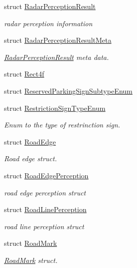 \begin{DoxyCompactItemize}
struct \hyperlink{structmaf__perception__interface_1_1RadarPerceptionResult}{Radar\+Perception\+Result}
\begin{DoxyCompactList}\small\item\em radar perception information \end{DoxyCompactList}\item 
struct \hyperlink{structmaf__perception__interface_1_1RadarPerceptionResultMeta}{Radar\+Perception\+Result\+Meta}
\begin{DoxyCompactList}\small\item\em \hyperlink{structmaf__perception__interface_1_1RadarPerceptionResult}{Radar\+Perception\+Result} meta data. \end{DoxyCompactList}\item 
struct \hyperlink{structmaf__perception__interface_1_1Rect4f}{Rect4f}
\item 
struct \hyperlink{structmaf__perception__interface_1_1ReservedParkingSignSubtypeEnum}{Reserved\+Parking\+Sign\+Subtype\+Enum}
\item 
struct \hyperlink{structmaf__perception__interface_1_1RestrictionSignTypeEnum}{Restriction\+Sign\+Type\+Enum}
\begin{DoxyCompactList}\small\item\em Enum to the type of restrinction sign. \end{DoxyCompactList}\item 
struct \hyperlink{structmaf__perception__interface_1_1RoadEdge}{Road\+Edge}
\begin{DoxyCompactList}\small\item\em Road edge struct. \end{DoxyCompactList}\item 
struct \hyperlink{structmaf__perception__interface_1_1RoadEdgePerception}{Road\+Edge\+Perception}
\begin{DoxyCompactList}\small\item\em road edge perception struct \end{DoxyCompactList}\item 
struct \hyperlink{structmaf__perception__interface_1_1RoadLinePerception}{Road\+Line\+Perception}
\begin{DoxyCompactList}\small\item\em road line perception struct \end{DoxyCompactList}\item 
struct \hyperlink{structmaf__perception__interface_1_1RoadMark}{Road\+Mark}
\begin{DoxyCompactList}\small\item\em \hyperlink{structmaf__perception__interface_1_1RoadMark}{Road\+Mark} struct. \end{DoxyCompactList}\item 

\end{DoxyCompactItemize}
